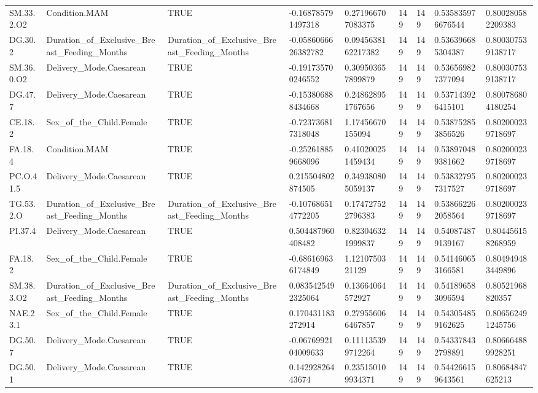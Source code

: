 \begin{longtable}{lllllllll}
SM.33.2.O2 & Condition.MAM & TRUE & -0.168785791497318 & 0.271966707083375 & 149 & 149 & 0.535835976676544 & 0.800280582209383 \\
DG.30.2 & Duration\_of\_Exclusive\_Breast\_Feeding\_Months & Duration\_of\_Exclusive\_Breast\_Feeding\_Months & -0.0586066626382782 & 0.0945638162217382 & 149 & 149 & 0.536396685304387 & 0.800307539138717 \\
SM.36.0.O2 & Delivery\_Mode.Caesarean & TRUE & -0.191735700246552 & 0.309503657899879 & 149 & 149 & 0.536569827377094 & 0.800307539138717 \\
DG.47.7 & Delivery\_Mode.Caesarean & TRUE & -0.153806888434668 & 0.248628951767656 & 149 & 149 & 0.537143926415101 & 0.800786804180254 \\
CE.18.2 & Sex\_of\_the\_Child.Female & TRUE & -0.723736817318048 & 1.17456670155094 & 149 & 149 & 0.538752853856526 & 0.802000239718697 \\
FA.18.4 & Condition.MAM & TRUE & -0.252618859668096 & 0.410200251459434 & 149 & 149 & 0.538970489381662 & 0.802000239718697 \\
PC.O.41.5 & Delivery\_Mode.Caesarean & TRUE & 0.215504802874505 & 0.349380805059137 & 149 & 149 & 0.538327957317527 & 0.802000239718697 \\
TG.53.2.O & Duration\_of\_Exclusive\_Breast\_Feeding\_Months & Duration\_of\_Exclusive\_Breast\_Feeding\_Months & -0.107686514772205 & 0.174727522796383 & 149 & 149 & 0.538662262058564 & 0.802000239718697 \\
PI.37.4 & Delivery\_Mode.Caesarean & TRUE & 0.504487960408482 & 0.823046321999837 & 149 & 149 & 0.540874879139167 & 0.804456158268959 \\
FA.18.2 & Sex\_of\_the\_Child.Female & TRUE & -0.686169636174849 & 1.1210750321129 & 149 & 149 & 0.541460653166581 & 0.804949483449896 \\
SM.38.3.O2 & Duration\_of\_Exclusive\_Breast\_Feeding\_Months & Duration\_of\_Exclusive\_Breast\_Feeding\_Months & 0.0835425492325064 & 0.13664064572927 & 149 & 149 & 0.541896583096594 & 0.80521968820357 \\
NAE.23.1 & Sex\_of\_the\_Child.Female & TRUE & 0.170431183272914 & 0.279556066467857 & 149 & 149 & 0.543054859162625 & 0.806562491245756 \\
DG.50.7 & Delivery\_Mode.Caesarean & TRUE & -0.0676992104009633 & 0.111135399712264 & 149 & 149 & 0.543378432798891 & 0.806664889928251 \\
DG.50.1 & Delivery\_Mode.Caesarean & TRUE & 0.14292826443674 & 0.235150109934371 & 149 & 149 & 0.544266159643561 & 0.80684847625213 \\

\end{longtable}
